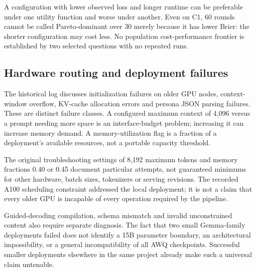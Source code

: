 A configuration with lower observed loss and longer runtime can be preferable under one utility function and worse under another. Even on C1, 60 rounds cannot be called Pareto-dominant over 30 merely because it has lower Brier: the shorter configuration may cost less. No population cost-performance frontier is established by two selected questions with no repeated runs.

\subsection{Hardware routing and deployment failures}
\label{sec:small_model_limits}
The historical log discusses initialization failures on older GPU nodes, context-window overflow, KV-cache allocation errors and persona JSON parsing failures. These are distinct failure classes. A configured maximum context of 4,096 versus a prompt needing more space is an interface-budget problem; increasing it can increase memory demand. A memory-utilization flag is a fraction of a deployment's available resources, not a portable capacity threshold.

The original troubleshooting settings of 8,192 maximum tokens and memory fractions 0.40 or 0.45 document particular attempts, not guaranteed minimums for other hardware, batch sizes, tokenizers or serving revisions. The recorded A100 scheduling constraint addressed the local deployment; it is not a claim that every older GPU is incapable of every operation required by the pipeline.

Guided-decoding compilation, schema mismatch and invalid unconstrained content also require separate diagnosis. The fact that two small Gemma-family deployments failed does not identify a 15B parameter boundary, an architectural impossibility, or a general incompatibility of all AWQ checkpoints. Successful smaller deployments elsewhere in the same project already make such a universal claim untenable.

